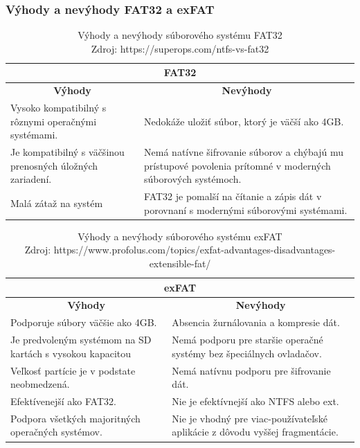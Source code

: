 \documentclass[12pt,oneside,slovak,a4paper]{article}
\begin{document}
\subsubsection{Výhody a nevýhody FAT32 a exFAT}

\begin{table}[H]
\begin{tabularx}{\textwidth}{|X|X|}
\hline
\multicolumn{2}{|c|}{\textbf{FAT32}} \\ \hline
\multicolumn{1}{|c|}{\textbf{Výhody}} & \multicolumn{1}{c|}{\textbf{Nevýhody}} \\ \hline
Vysoko kompatibilný s rôznymi operačnými systémami. & Nedokáže uložiť súbor, ktorý je väčší ako 4GB. \\ \hline
Je kompatibilný s väčšinou prenosných úložných zariadení. & Nemá natívne šifrovanie súborov a chýbajú mu prístupové povolenia prítomné v moderných súborových systémoch. \\ \hline
Malá zátaž na systém & FAT32 je pomalší na čítanie a zápis dát v porovnaní s modernými súborovými systémami. \\ \hline
\end{tabularx}
\centering
\captionsetup{justification=centering,margin=2cm}
\caption{Výhody a nevýhody súborového systému FAT32 \\ Zdroj: https://superops.com/ntfs-vs-fat32}
\end{table}

\begin{table}[H]
\begin{tabularx}{\textwidth}{|X|X|}
\hline
\multicolumn{2}{|c|}{\textbf{exFAT}} \\ \hline
\multicolumn{1}{|c|}{\textbf{Výhody}} & \multicolumn{1}{c|}{\textbf{Nevýhody}} \\ \hline
Podporuje súbory väčšie ako 4GB. & Absencia žurnálovania a kompresie dát. \\ \hline
Je predvoleným systémom na SD kartách s vysokou kapacitou & Nemá podporu pre staršie operačné systémy bez špeciálnych ovladačov. \\ \hline
Veľkosť partície je v podstate neobmedzená. & Nemá natívnu podporu pre šifrovanie dát. \\ \hline
Efektívenejší ako FAT32. & Nie je efektívnejší ako NTFS alebo ext. \\ \hline
Podpora všetkých majoritných operačných systémov. & Nie je vhodný pre viac-používateľské aplikácie z dôvodu vyššej fragmentácie. \\ \hline
\end{tabularx}
\centering
\captionsetup{justification=centering,margin=2cm}
\caption{Výhody a nevýhody súborového systému exFAT \\ Zdroj: https://www.profolus.com/topics/exfat-advantages-disadvantages-extensible-fat/}
\end{table}
\end{document}
